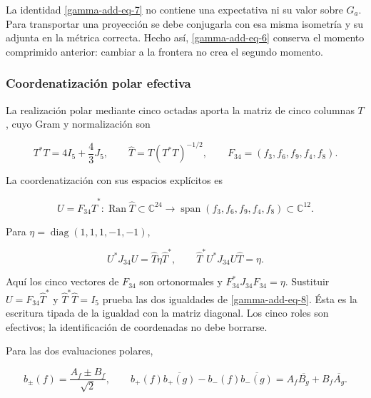 La identidad \eqref{gamma-add-eq-7} no contiene una expectativa ni su valor sobre \(G_a\). Para transportar una proyección se debe conjugarla con esa misma isometría y su adjunta en la métrica correcta. Hecho así, \eqref{gamma-add-eq-6} conserva el momento comprimido anterior: cambiar a la frontera no crea el segundo momento.

\subsubsection{Coordenatización polar efectiva}
\label{gamma-add-sub-220}

La realización polar mediante cinco octadas aporta la matriz de cinco
columnas \(T\), cuyo Gram y normalización son

\begin{equation}
T^*T=4I_5+\frac43J_5,\qquad
\widehat T=T(T^*T)^{-1/2},\qquad
F_{34}=(f_3,f_6,f_9,f_4,f_8).
\label{gamma-add-display-18}
\end{equation}

La coordenatización con sus espacios explícitos es

\begin{equation}
U=F_{34}\widehat T^*:
\operatorname{Ran}\widehat T\subset\mathbb C^{24}
\longrightarrow\operatorname{span}(f_3,f_6,f_9,f_4,f_8)\subset\mathbb C^{12}.
\label{gamma-add-display-19}
\end{equation}

Para \(\eta=\operatorname{diag}(1,1,1,-1,-1)\),

\begin{equation}
U^*J_{34}U=\widehat T\eta\widehat T^*,\qquad
\widehat T^*U^*J_{34}U\widehat T=\eta.
\label{gamma-add-eq-8}
\end{equation}

Aquí los cinco vectores de \(F_{34}\) son ortonormales y
\(F_{34}^*J_{34}F_{34}=\eta\). Sustituir
\(U=F_{34}\widehat T^*\) y \(\widehat T^*\widehat T=I_5\)
prueba las dos igualdades de \eqref{gamma-add-eq-8}.
Ésta es la escritura tipada de la igualdad con la matriz diagonal.
Los cinco roles son efectivos; la identificación de coordenadas no
debe borrarse.

Para las dos evaluaciones polares,

\begin{equation}
b_\pm(f)=\frac{A_f\pm B_f}{\sqrt2},\qquad
b_+(f)\overline{b_+(g)}-b_-(f)\overline{b_-(g)}
=A_f\overline{B_g}+B_f\overline{A_g}.
\label{gamma-add-eq-9}
\end{equation}

